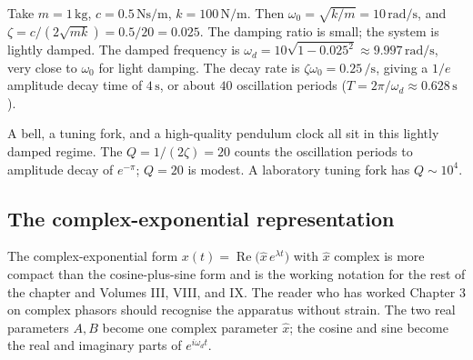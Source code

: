 Take $m = 1\,\si{\kilogram}$, $c = 0.5\,\si{\newton\second\per\meter}$,
$k = 100\,\si{\newton\per\meter}$. Then $\omega_{0} = \sqrt{k/m} =
10\,\si{\radian\per\second}$, and $\zeta = c / (2\sqrt{m k}) = 0.5
/ 20 = 0.025$. The damping ratio is small; the system is
lightly damped. The damped frequency is $\omega_{d} = 10
\sqrt{1 - 0.025^{2}} \approx 9.997\,\si{\radian\per\second}$, very
close to $\omega_{0}$ for light damping. The decay rate is $\zeta
\omega_{0} = 0.25\,\si{\per\second}$, giving a $1/e$ amplitude
decay time of $4\,\si{\second}$, or about $40$ oscillation periods
($T = 2\pi/\omega_{d} \approx 0.628\,\si{\second}$).

A bell, a tuning fork, and a high-quality pendulum clock all sit in
this lightly damped regime. The  $Q = 1 /
(2 \zeta) = 20$ counts the oscillation periods to amplitude decay
of $e^{-\pi}$; $Q = 20$ is modest. A laboratory tuning fork has $Q
\sim 10^{4}$.

\subsection{The complex-exponential representation}

The complex-exponential form $x(t) = \operatorname{Re}\bigl(\hat{x}\,
e^{\lambda t}\bigr)$ with $\hat{x}$ complex is more compact than
the cosine-plus-sine form and is the working notation for the rest
of the chapter and Volumes III, VIII, and IX. The reader who has
worked Chapter 3 on complex phasors should recognise the apparatus
without strain. The two real parameters $A, B$ become one complex
parameter $\hat{x}$; the cosine and sine become the real and
imaginary parts of $e^{i \omega_{d} t}$.

